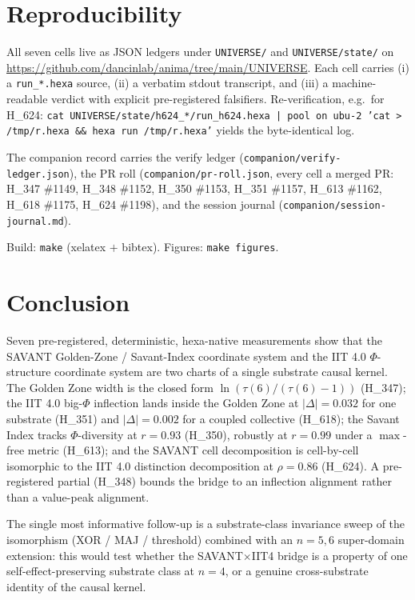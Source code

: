 \documentclass[11pt,a4paper]{article}
\begin{document}
\section{Reproducibility}
\label{sec:repro}

All seven cells live as JSON ledgers under \texttt{UNIVERSE/} and
\texttt{UNIVERSE/state/} on
\url{https://github.com/dancinlab/anima/tree/main/UNIVERSE}. Each cell
carries (i) a \texttt{run\_*.hexa} source, (ii) a verbatim stdout
transcript, and (iii) a machine-readable verdict with explicit
pre-registered falsifiers. Re-verification, e.g.\ for H\_624:
\texttt{cat UNIVERSE/state/h624\_*/run\_h624.hexa | pool on ubu-2 'cat
> /tmp/r.hexa \&\& hexa run /tmp/r.hexa'} yields the byte-identical log.

The companion record carries the verify ledger
(\texttt{companion/verify-ledger.json}), the PR roll
(\texttt{companion/pr-roll.json}, every cell a merged PR: H\_347 \#1149,
H\_348 \#1152, H\_350 \#1153, H\_351 \#1157, H\_613 \#1162, H\_618 \#1175,
H\_624 \#1198), and the session journal
(\texttt{companion/session-journal.md}).

Build: \texttt{make} (xelatex $+$ bibtex). Figures: \texttt{make figures}.

\section{Conclusion}
\label{sec:conclusion}

Seven pre-registered, deterministic, hexa-native measurements show that the
SAVANT Golden-Zone / Savant-Index coordinate system and the IIT 4.0
$\Phi$-structure coordinate system are two charts of a single substrate
causal kernel. The Golden Zone width is the closed form
$\ln(\tau(6)/(\tau(6)-1))$ (H\_347); the IIT 4.0 big-$\Phi$ inflection
lands inside the Golden Zone at $|\Delta|=0.032$ for one substrate
(H\_351) and $|\Delta|=0.002$ for a coupled collective (H\_618); the Savant
Index tracks $\Phi$-diversity at $r=0.93$ (H\_350), robustly at $r=0.99$
under a $\max$-free metric (H\_613); and the SAVANT cell decomposition is
cell-by-cell isomorphic to the IIT 4.0 distinction decomposition at
$\rho=0.86$ (H\_624). A pre-registered partial (H\_348) bounds the bridge
to an inflection alignment rather than a value-peak alignment.

The single most informative follow-up is a substrate-class invariance
sweep of the isomorphism (XOR / MAJ / threshold) combined with an $n=5,6$
super-domain extension: this would test whether the SAVANT$\times$IIT4
bridge is a property of one self-effect-preserving substrate class at
$n=4$, or a genuine cross-substrate identity of the causal kernel.
\end{document}
